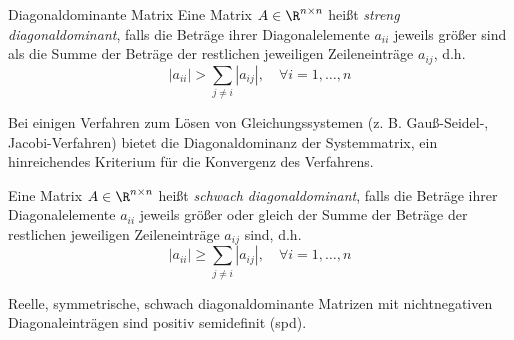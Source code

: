 \begin{defi}{Diagonaldominante Matrix}
    Eine Matrix $A \in \R^{n \times n}$ heißt \emph{streng diagonaldominant}, falls die Beträge ihrer Diagonalelemente $a_{ii}$ jeweils größer sind als die Summe der Beträge der restlichen jeweiligen Zeileneinträge $a_{ij}$, d.h.
    \[
        |a_{ii}| > \sum_{j \neq i} |a_{ij}|, \quad \forall i = 1, \ldots, n
    \]

    Bei einigen Verfahren zum Lösen von Gleichungssystemen (z. B. Gauß-Seidel-, Jacobi-Verfahren) bietet die Diagonaldominanz der Systemmatrix, ein hinreichendes Kriterium für die Konvergenz des Verfahrens.

    Eine Matrix $A \in \R^{n \times n}$ heißt \emph{schwach diagonaldominant}, falls die Beträge ihrer Diagonalelemente $a_{ii}$ jeweils größer oder gleich der Summe der Beträge der restlichen jeweiligen Zeileneinträge $a_{ij}$ sind, d.h.
    \[
        |a_{ii}| \geq \sum_{j \neq i} |a_{ij}|, \quad \forall i = 1, \ldots, n
    \]

    Reelle, symmetrische, schwach diagonaldominante Matrizen mit nichtnegativen Diagonaleinträgen sind positiv semidefinit (spd).
\end{defi}

